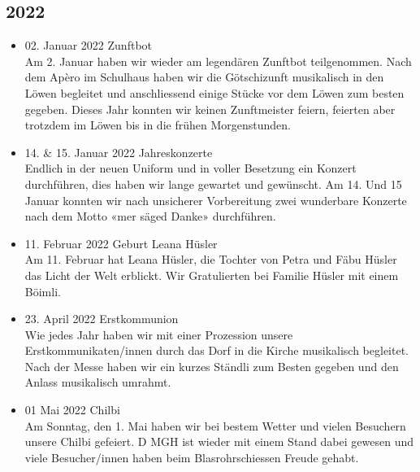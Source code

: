 \subsection*{2022}
\begin{history}


    \begin{itemize}

        \item 02. Januar 2022 Zunftbot\\
              Am 2. Januar haben wir wieder am legendären Zunftbot teilgenommen.
              Nach dem Apèro im Schulhaus haben wir die Götschizunft musikalisch in den Löwen
              begleitet und anschliessend einige Stücke vor dem Löwen zum besten gegeben. Dieses Jahr
              konnten wir keinen Zunftmeister feiern, feierten aber trotzdem im Löwen bis in die frühen
              Morgenstunden.

        \item 14. & 15. Januar 2022 Jahreskonzerte\\
              Endlich in der neuen Uniform und in voller Besetzung ein Konzert durchführen, dies haben
              wir lange gewartet und gewünscht. Am 14. Und 15 Januar konnten wir nach unsicherer
              Vorbereitung zwei wunderbare Konzerte nach dem Motto «mer säged Danke» durchführen.

        \item 11. Februar 2022 Geburt Leana Hüsler\\
              Am 11. Februar hat Leana Hüsler, die Tochter von Petra und Fäbu Hüsler das Licht der Welt
              erblickt. Wir Gratulierten bei Familie Hüsler mit einem Böimli.

        \item 23. April 2022 Erstkommunion\\
              Wie jedes Jahr haben wir mit einer Prozession unsere Erstkommunikaten/innen durch das
              Dorf in die Kirche musikalisch begleitet.
              Nach der Messe haben wir ein kurzes Ständli zum Besten gegeben und den Anlass
              musikalisch umrahmt.

        \item 01 Mai 2022 Chilbi\\
              Am Sonntag, den 1. Mai haben wir bei bestem Wetter und vielen Besuchern unsere Chilbi
              gefeiert.
              D MGH ist wieder mit einem Stand dabei gewesen und viele Besucher/innen haben beim
              Blasrohrschiessen Freude gehabt.


\end{itemize}
\end{history}
